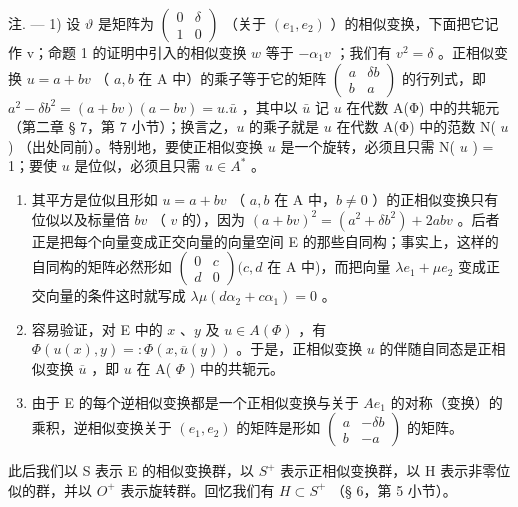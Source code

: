注. --- 1) 设 \(\vartheta\) 是矩阵为 \(\begin{pmatrix}0 & \delta \\ 1 & 0\end{pmatrix}\) （关于 \((e_1, e_2)\) ）的相似变换，下面把它记作 v；命题 1 的证明中引入的相似变换 \(w\) 等于 \(-\alpha_1 v\) ；我们有 \(v^2 = \delta\) 。正相似变换 \(u = a + b v\) （ \(a, b\) 在 A 中）的乘子等于它的矩阵 \(\begin{pmatrix}a & \delta b \\ b & a\end{pmatrix}\) 的行列式，即 \(a^2 - \delta b^2 = (a + b v)(a - b v) = u.\bar{u}\) ，其中以 \(\bar{u}\) 记 \(u\) 在代数 A(Φ) 中的共轭元（第二章 § 7，第 7 小节）；换言之，\(u\) 的乘子就是 \(u\) 在代数 A(Φ) 中的范数 N( \(u\) ) （出处同前）。特别地，要使正相似变换 \(u\) 是一个旋转，必须且只需 N( \(u\) ) = 1；要使 \(u\) 是位似，必须且只需 \(u \in A^*\) 。

\begin{enumerate}
\def\labelenumi{\arabic{enumi})}
\setcounter{enumi}{1}
\item
  其平方是位似且形如 \(u = a + bv\) （ \(a, b\) 在 A 中，\(b \neq 0\) ）的正相似变换只有位似以及标量倍 \(bv\) （ \(v\) 的），因为 \((a + bv)^{2} = (a^{2} + \delta b^{2}) + 2abv\) 。后者正是把每个向量变成正交向量的向量空间 E 的那些自同构；事实上，这样的自同构的矩阵必然形如 \(\begin{pmatrix} 0 & c \\ d & 0 \end{pmatrix} (c, d\) 在 A 中)，而把向量 \(\lambda e_{1} + \mu e_{2}\) 变成正交向量的条件这时就写成 \(\lambda \mu(d\alpha_{2} + c\alpha_{1}) = 0\) 。
\item
  容易验证，对 E 中的 \(x\) 、\(y\) 及 \(u \in A(\Phi)\) ，有 \(\Phi(u(x), y) =: \Phi(x, \overline{u}(y))\) 。于是，正相似变换 \(u\) 的伴随自同态是正相似变换 \(\overline{u}\) ，即 \(u\) 在 A( \(\Phi\) ) 中的共轭元。
\item
  由于 E 的每个逆相似变换都是一个正相似变换与关于 \(Ae_{1}\) 的对称（变换）的乘积，逆相似变换关于 \((e_{1}, e_{2})\) 的矩阵是形如 \(\begin{pmatrix} a & -\delta b \\ b & -a \end{pmatrix}\) 的矩阵。
\end{enumerate}

此后我们以 S 表示 E 的相似变换群，以 \(S^{+}\) 表示正相似变换群，以 H 表示非零位似的群，并以 \(O^{+}\) 表示旋转群。回忆我们有 \(H \subset S^{+}\) （§ 6，第 5 小节）。


